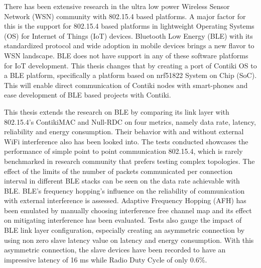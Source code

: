 There has been extensive research in the ultra low power Wireless Sensor Network (WSN) community with 802.15.4 based platforms. A major factor for this is the support for 802.15.4 based platforms in lightweight Operating Systems (OS) for Internet of Things (IoT) devices. Bluetooth Low Energy (BLE) with its standardized protocol and wide adoption in mobile devices brings a new flavor to WSN landscape. BLE does not have support in any of these software platforms for IoT development. This thesis changes that by creating a port of Contiki OS to a BLE platform, specifically a platform based on nrf51822 System on Chip (SoC). This will enable direct communication of Contiki nodes with smart-phones and ease development of BLE based projects with Contiki.

This thesis extends the research on BLE by comparing its link layer with 802.15.4's ContikiMAC and Null-RDC on four metrics, namely data rate, latency, reliability and energy consumption. Their behavior with and without external WiFi interference also has been looked into. The tests conducted showcases the performance of simple point to point communication 802.15.4, which is rarely benchmarked in research community that prefers testing complex topologies. The effect of the limits of the number of packets communicated per connection interval in different BLE stacks can be seen on the data rate achievable with BLE. BLE's frequency hopping's influence on the reliability of communication with external interference is assessed. Adaptive Frequency Hopping (AFH) has been emulated by manually choosing interference free channel map and its effect on mitigating interference has been evaluated. Tests also gauge the impact of BLE link layer configuration, especially creating an asymmetric connection by using non zero slave latency value on latency and energy consumption. With this asymmetric connection, the slave devices have been recorded to have an impressive latency of 16 ms while Radio Duty Cycle of only 0.6\%. 




